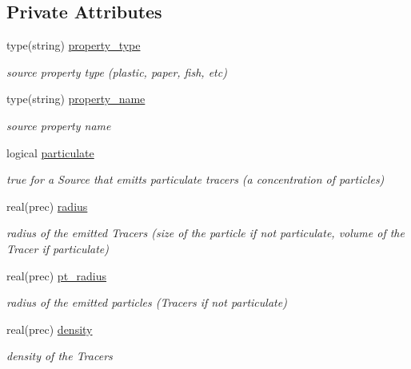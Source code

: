 \subsection*{Private Attributes}
\begin{DoxyCompactItemize}
\item 
type(string) \mbox{\hyperlink{structsources__mod_1_1source__prop_a071dfa986af6218c0add70010ab2a37e}{property\+\_\+type}}
\begin{DoxyCompactList}\small\item\em source property type (plastic, paper, fish, etc) \end{DoxyCompactList}\item 
type(string) \mbox{\hyperlink{structsources__mod_1_1source__prop_a3b01eb6b3826bc1ac3a97609929692bb}{property\+\_\+name}}
\begin{DoxyCompactList}\small\item\em source property name \end{DoxyCompactList}\item 
logical \mbox{\hyperlink{structsources__mod_1_1source__prop_af02d964cfaa712c12127327719794fde}{particulate}}
\begin{DoxyCompactList}\small\item\em true for a Source that emitts particulate tracers (a concentration of particles) \end{DoxyCompactList}\item 
real(prec) \mbox{\hyperlink{structsources__mod_1_1source__prop_af4cc47a1f8a8d28088150eba368d80a5}{radius}}
\begin{DoxyCompactList}\small\item\em radius of the emitted Tracers (size of the particle if not particulate, volume of the Tracer if particulate) \end{DoxyCompactList}\item 
real(prec) \mbox{\hyperlink{structsources__mod_1_1source__prop_a66219c6ba24db75abf401de5c5fa875d}{pt\+\_\+radius}}
\begin{DoxyCompactList}\small\item\em radius of the emitted particles (Tracers if not particulate) \end{DoxyCompactList}\item 
real(prec) \mbox{\hyperlink{structsources__mod_1_1source__prop_ac569c18f02e33c5ca95f423bcb9fb30e}{density}}
\begin{DoxyCompactList}\small\item\em density of the Tracers \end{DoxyCompactList}\item 

\end{DoxyCompactItemize}
